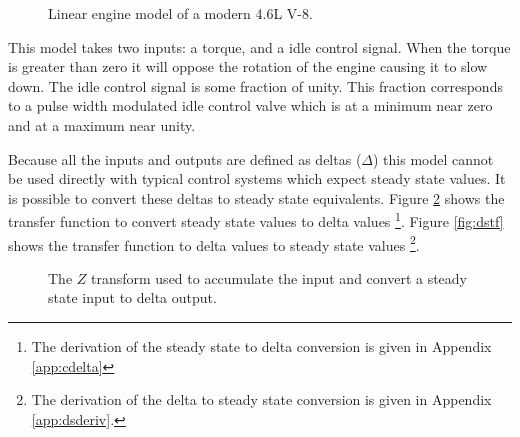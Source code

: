 \documentclass{article}
\begin{document}
\begin{figure}[hbp!]
\begin{center}


\end{center}
\caption{Linear engine model of a modern 4.6L V-8.}\label{fig:lem}
\end{figure}

This model takes two inputs: a torque, and a idle control signal.
When the torque is greater than zero it will oppose the rotation of
the engine causing it to slow down.
The idle control signal is some fraction of unity.
This fraction corresponds to a pulse width modulated idle control valve
which is at a minimum near zero and at a maximum near unity.

Because all the inputs and outputs are defined as deltas ($\Delta$)
this model cannot be used directly with typical control systems
which expect steady state values.
It is possible to convert these deltas to steady state equivalents.
Figure \ref{fig:sdtf} shows the transfer function to convert steady
state values to delta values
\footnote{The derivation of the steady state to delta conversion
is given in Appendix \ref{app:cdelta}}.
Figure \ref{fig:dstf} shows the transfer function to delta values
to steady state values
\footnote{The derivation of the delta to steady state conversion
is given in Appendix \ref{app:dsderiv}.}.

\begin{figure}[!htbp]
\begin{center}
\end{center}
\caption[xyz]{The $Z$ transform used to accumulate the input and convert
a steady state input to delta output.}
\label{fig:sdtf}
\end{figure}
\end{document}
